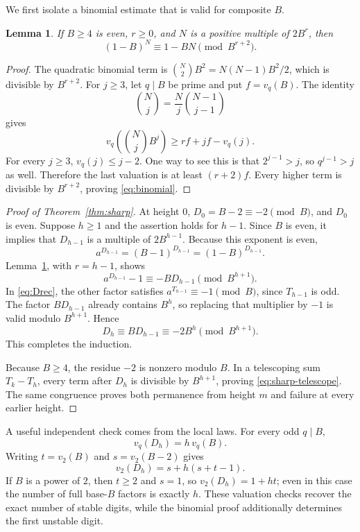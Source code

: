 \documentclass[11pt,letterpaper]{article}
\numberwithin{equation}{section}
\newtheorem{lemma}[theorem]{Lemma}
\theoremstyle{definition}
\theoremstyle{remark}
\begin{document}
We first isolate a binomial estimate that is valid for composite $B$.

\begin{lemma}\label{lem:binomial}
If $B\ge4$ is even, $r\ge0$, and $N$ is a positive multiple of $2B^r$, then
\begin{equation}\label{eq:binomial}
 (1-B)^N\equiv1-BN\pmod{B^{r+2}}.
\end{equation}
\end{lemma}
\begin{proof}
The quadratic binomial term is
$\binom N2 B^2=N(N-1)B^2/2$, which is divisible by $B^{r+2}$. For $j\ge3$, let $q\mid B$ be prime and put $f=v_q(B)$. The identity
\[
 \binom Nj=\frac Nj\binom{N-1}{j-1}
\]
gives
\[
 v_q\!\left(\binom Nj B^j\right)
 \ge rf+jf-v_q(j).
\]
For every $j\ge3$, $v_q(j)\le j-2$. One way to see this is that
$2^{j-1}>j$, so $q^{j-1}>j$ as well. Therefore the last valuation is at least $(r+2)f$. Every higher term is divisible by $B^{r+2}$, proving \eqref{eq:binomial}.
\end{proof}

\begin{proof}[Proof of Theorem~\ref{thm:sharp}]
At height $0$, $D_0=B-2\equiv-2\pmod B$, and $D_0$ is even. Suppose $h\ge1$ and the assertion holds for $h-1$. Since $B$ is even, it implies that $D_{h-1}$ is a multiple of $2B^{h-1}$. Because this exponent is even,
\[
 a^{D_{h-1}}=(B-1)^{D_{h-1}}=(1-B)^{D_{h-1}}.
\]
Lemma~\ref{lem:binomial}, with $r=h-1$, shows
\[
 a^{D_{h-1}}-1\equiv-BD_{h-1}\pmod{B^{h+1}}.
\]
In \eqref{eq:Drec}, the other factor satisfies
$a^{T_{h-1}}\equiv-1\pmod B$, since $T_{h-1}$ is odd. The factor $BD_{h-1}$ already contains $B^h$, so replacing that multiplier by $-1$ is valid modulo $B^{h+1}$. Hence
\[
 D_h\equiv BD_{h-1}\equiv-2B^h\pmod{B^{h+1}}.
\]
This completes the induction.

Because $B\ge4$, the residue $-2$ is nonzero modulo $B$. In a telescoping sum $T_k-T_h$, every term after $D_h$ is divisible by $B^{h+1}$, proving \eqref{eq:sharp-telescope}. The same congruence proves both permanence from height $m$ and failure at every earlier height.
\end{proof}

A useful independent check comes from the local laws. For every odd $q\mid B$,
\[
 v_q(D_h)=h\,v_q(B).
\]
Writing $t=v_2(B)$ and $s=v_2(B-2)$ gives
\[
 v_2(D_h)=s+h(s+t-1).
\]
If $B$ is a power of $2$, then $t\ge2$ and $s=1$, so $v_2(D_h)=1+ht$; even in this case the number of full base-$B$ factors is exactly $h$. These valuation checks recover the exact number of stable digits, while the binomial proof additionally determines the first unstable digit.
\end{document}
